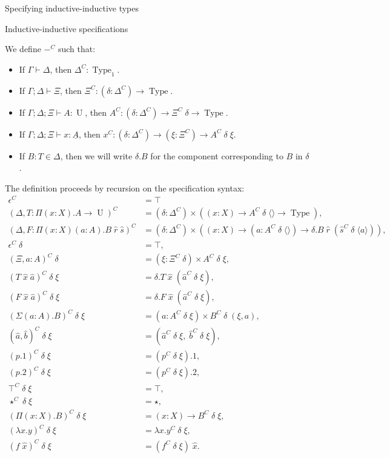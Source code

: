 \documentclass[runningheads]{llncs}
\DeclareMathOperator{\USet}{Type}
\DeclareMathOperator{\UU}{U}
\newcommand{\tac}{\vdash}
\def\emptytuple{\langle\rangle}
\begin{document}
{\begin{section}{Specifying inductive-inductive types}
\begin{subsection}{Inductive-inductive specifications}
\begin{definition}
We define $-^C$ such that:
\begin{itemize}
    \item If $\Gamma \tac \Delta$, then $\Delta^C : \USet_1$.
    \item If $\Gamma ; \Delta \tac \Xi$, then $\Xi^C : (\delta : \Delta^C) \to \USet$.
    \item If $\Gamma ; \Delta ; \Xi \tac A : \UU$, then $A^C : (\delta : \Delta^C) \to \Xi^C\;\delta \to \USet$.
    \item If $\Gamma ; \Delta ; \Xi \tac x : \underline{A}$, then $x^C : (\delta : \Delta^C) \to (\xi : \Xi^C) \to A^C\;\delta\;\xi$.
    \item If $B : T \in \Delta$, then we will write $\delta . B$ for the component corresponding to $B$ in $\delta$. %
\end{itemize}
The definition proceeds by recursion on the specification syntax:
\begin{align*}
\epsilon^C &= \top\\
(\Delta , T : \Pi(x : X).A \to \UU)^C &= (\delta : \Delta^C)\times ((x : X) \to A^C\;\delta\;\emptytuple \to \USet),\\
(\Delta , F : \Pi(x : X)(a : A).B\;\hat{r}\;\hat{s})^C &= (\delta : \Delta^C) \times ((x : X) \to (a : A^C\;\delta\;\emptytuple) \to \delta.B\;\hat{r}\;(\hat{s}^C\;\delta\;\langle a \rangle)),\\
\epsilon^C\;\delta &= \top,\\
(\Xi , a : A)^C\;\delta &= (\xi : \Xi^C\;\delta) \times A^C\;\delta\;\xi,\\
(T\;\hat{x}\;\hat{a})^C\;\delta\;\xi &= \delta.T\;\hat{x}\;(\hat{a}^C\;\delta\;\xi),\\
(F\;\hat{x}\;\hat{a})^C\;\delta\;\xi &= \delta.F\;\hat{x}\;(\hat{a}^C\;\delta\;\xi),\\
(\Sigma(a : A).B)^C\;\delta\;\xi & = (a : A^C\;\delta\;\xi) \times B^C\;\delta\;(\xi , a),\\
(\hat{a} , \hat{b})^C\;\delta\;\xi & = (\hat{a}^C\;\delta\;\xi ,\; \hat{b}^C\;\delta\;\xi),\\
(p.1)^C\;\delta\;\xi &= (p^C\;\delta\;\xi).1,\\
(p.2)^C\;\delta\;\xi &= (p^C\;\delta\;\xi).2,\\
\top^C\;\delta\;\xi &= \top,\\
\star^C\;\delta\;\xi &= \star,\\
(\Pi(x : X).B)^C\;\delta\;\xi &= (x : X) \to B^C\;\delta\;\xi,\\
(\lambda x.y)^C\;\delta\;\xi &= \lambda x. y^C\;\delta\;\xi,\\
(f\;\hat{x})^C\;\delta\;\xi &= (f^C\;\delta\;\xi)\;\hat{x}.
\end{align*}


\end{definition}
\end{subsection}
\end{section}}
\end{document}

